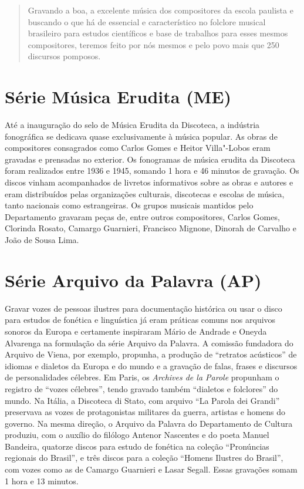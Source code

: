 \begin{quote}
Gravando a boa, a excelente música dos compositores da escola paulista e
buscando o que há de essencial e característico no folclore musical
brasileiro para estudos científicos e base de trabalhos para esses
mesmos compositores, teremos feito por nós mesmos e pelo povo mais que
250 discursos pomposos.
\end{quote}

\section*{Série Música Erudita (ME)}

Até a inauguração do selo de Música Erudita da Discoteca, a indústria
fonográfica se dedicava quase exclusivamente à música popular. As obras
de compositores consagrados como Carlos Gomes e Heitor Villa"-Lobos eram
gravadas e prensadas no exterior. Os fonogramas de música erudita da
Discoteca foram realizados entre 1936 e 1945, somando 1 hora e 46
minutos de gravação. Os discos vinham acompanhados de livretos
informativos sobre as obras e autores e eram distribuídos pelas
organizações culturais, discotecas e escolas de música, tanto nacionais
como estrangeiras. Os grupos musicais mantidos pelo Departamento
gravaram peças de, entre outros compositores, Carlos Gomes, Clorinda
Rosato, Camargo Guarnieri, Francisco Mignone, Dinorah de Carvalho e João
de Sousa Lima.

\section*{Série Arquivo da Palavra (AP)}

Gravar vozes de pessoas ilustres para documentação histórica ou usar o
disco para estudos de fonética e linguística já eram práticas comuns nos
arquivos sonoros da Europa e certamente inspiraram Mário de Andrade e
Oneyda Alvarenga na formulação da série Arquivo da Palavra. A comissão
fundadora do Arquivo de Viena, por exemplo, propunha, a produção de
``retratos acústicos'' de idiomas e dialetos da Europa e do mundo e a
gravação de falas, frases e discursos de personalidades célebres. Em
Paris, os \emph{Archives de la Parole} propunham o registro de ``vozes
célebres'', tendo gravado também ``dialetos e folclores'' do mundo. Na
Itália, a Discoteca di Stato, com arquivo ``La Parola dei Grandi''
preservava as vozes de protagonistas militares da guerra, artistas e
homens do governo. Na mesma direção, o Arquivo da Palavra do
Departamento de Cultura produziu, com o auxílio do filólogo Antenor
Nascentes e do poeta Manuel Bandeira, quatorze discos para estudo de
fonética na coleção ``Pronúncias regionais do Brasil'', e três discos
para a coleção ``Homens Ilustres do Brasil'', com vozes como as de
Camargo Guarnieri e Lasar Segall. Essas gravações somam 1 hora e 13
minutos.

